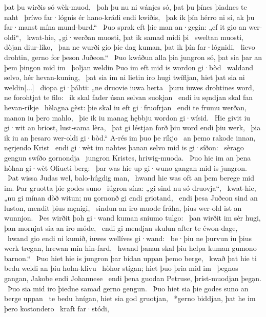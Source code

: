 þat þu wirðis só wèk-muod, \hld\ þoh þu nu ni wánjes só,
þat þu þínes þiadnes te naht \hld\ þríwo far·lógnis
ér hano-krádi endi kwiðis, \hld\ þak ik þín hérro ni sí,
ak þu far·manst mína mund-burd.“ \hld\ Þuo sprak eft þie man an·gegin:
„ef it gio an wer-oldi“, \hld\ kwat-hie, „gi·werðan muosti,
þat ik samad midi þi \hld\ sweltan muosti,
dòjan diur-líko, \hld\ þan ne wurði gio þie dag kuman,
þat ik þín far·lógnidi, \hld\ lievo drohtin,
gerno for þeson Juðeon.“ \hld\ Þuo kwáðun alla þia jungron só,
þat sia þar an þem þingon mid im \hld\ þoljan weldin
Þuo im eft mid is wordon gi·bòd \hld\ waldand selvo,
hér hevan-kuning, \hld\ þat sia im ni lietin iro hugi twífljan,
hiet þat sia ni weldin[...] \hld\ diopa gi·þáhti:
„ne druovie iuwa herta \hld\ þuru iuwes drohtines word,
ne forohtjat te filo: \hld\ ik skal fader úsan
selvan suokjan \hld\ endi iu sęndjan skal
fan hevan-ríkje \hld\ hèlagna gèst:
þie skal iu eft gi·fruofrjan \hld\ endi te frumu werðan,
manon iu þero mahlo, \hld\ þie ik iu manag hębbju
wordon gi·wísid. \hld\ Hie givit iu gi·wit an briost,
lust-sama lèra, \hld\ þat gi léstjan forð
þiu word endi þiu werk, \hld\ þia ik iu an þesaro wer-oldi gi·bòd.“
A-rés im þuo þe ríkjo \hld\ an þemo rakode innan,
nęrjendo Krist \hld\ endi gi·wèt im nahtes þanan
selvo mid is gi·síðon: \hld\ sèrago gengun
swíðo gornondja \hld\ jungron Kristes,
hriwig-muoda. \hld\ Þuo hie im an þena hòhan gi·wèt
Oliueti-berg: \hld\ þar was hie up gi·wuno
gangan mid is jungron. \hld\ Þat wissa Judas wel,
balo-húgdig man, \hld\ hwand hie was oft an þem berege mid im.
Þar gruotta þie godes suno \hld\ iúgron sína:%
„gi sind nu só druovja“, \hld\ kwat-hie, „nu gi mínan dòð witun;
nu gornonð gi endi griotand, \hld\ endi þesa Juðeon sind an luston,
mendit þius męnigi, \hld\ sindun an iro muode fráha,
þius wer-old ist an wunnjon. \hld\ Þes wirðit þoh gi·wand kuman
sniumo tulgo: \hld\ þan wirðit im sèr hugi,
þan mornjat sia an iro móde, \hld\ endi gi mendjan skulun
after te éwon-dage, \hld\ hwand gio endi ni kumið,
iuwes wellíves gi·wand: \hld\ be·þiu ne þurvun iu þius werk tregan,
hrewan mín hin-fard, \hld\ hwand þanan skal þiu helpa kuman
gumono barnon.“ \hld\ Þuo hiet hie is jungron þar
bídan uppan þemo berge, \hld\ kwað þat hie ti bedu weldi
an þiu holm-klivu \hld\ hòhor stígan;
hiet þuo þria mid im \hld\ þegnos gangan,
Jakobe endi Johannese \hld\ endi þena guodan Petruse,
þríst-muodjan þegạn. \hld\ Þuo sia mid iro þiedne samad
gerno gengun. \hld\ Þuo hiet sia þie godes suno
an berge uppan \hld\ te bedu hnígan,
hiet sia god gruotjan, \hld\ *gerno biddjan,
þat he im þero kostondero \hld\ kraft far·stódi,

